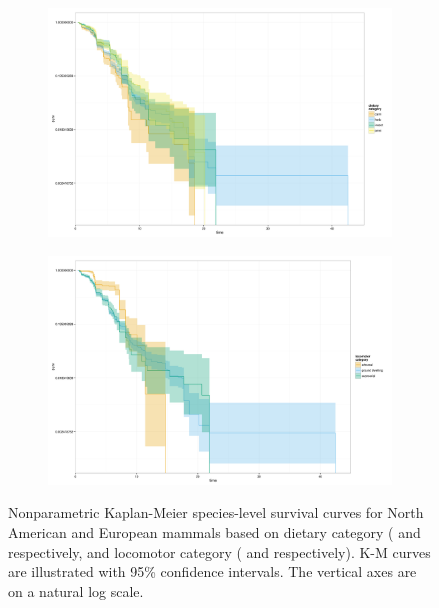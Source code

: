 \documentclass[12pt,letterpaper]{article}
\begin{document}
\begin{figure}[ht]
\begin{center}
    \begin{subfigure}[b]{0.4\textwidth}
      \caption{}
      \includegraphics[width = \textwidth, keepaspectratio = true]{figure/km_erd}
      \label{subfig:km_erd}
    \end{subfigure}
    \begin{subfigure}[b]{0.4\textwidth}
      \caption{}
      \includegraphics[width = \textwidth, keepaspectratio = true]{figure/km_erl}
      \label{subfig:km_erl}
    \end{subfigure}
  \end{center}
  \caption{Nonparametric Kaplan-Meier species-level survival curves for North American and European mammals based on dietary category ( and  respectively, and locomotor category ( and  respectively). K-M curves are illustrated with 95\% confidence intervals. The vertical axes are on a natural log scale.}
  \label{fig:mam_surv_curv}
\end{figure}
\end{document}
